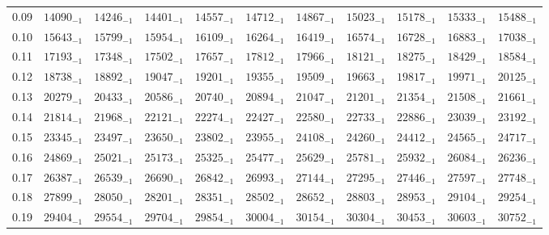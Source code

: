\documentclass[10pt, a4paper]{article}
\begin{document}
\begin{center}
\begin{longtable}{c | c c c c c | c c c c c}
        0.09 & \({14090}_{-1}\) & \({14246}_{-1}\) & \({14401}_{-1}\) & \({14557}_{-1}\) & \({14712}_{-1}\) & \({14867}_{-1}\) & \({15023}_{-1}\) & \({15178}_{-1}\) & \({15333}_{-1}\) & \({15488}_{-1}\)\\
        0.10 & \({15643}_{-1}\) & \({15799}_{-1}\) & \({15954}_{-1}\) & \({16109}_{-1}\) & \({16264}_{-1}\) & \({16419}_{-1}\) & \({16574}_{-1}\) & \({16728}_{-1}\) & \({16883}_{-1}\) & \({17038}_{-1}\)\\
        0.11 & \({17193}_{-1}\) & \({17348}_{-1}\) & \({17502}_{-1}\) & \({17657}_{-1}\) & \({17812}_{-1}\) & \({17966}_{-1}\) & \({18121}_{-1}\) & \({18275}_{-1}\) & \({18429}_{-1}\) & \({18584}_{-1}\)\\
        0.12 & \({18738}_{-1}\) & \({18892}_{-1}\) & \({19047}_{-1}\) & \({19201}_{-1}\) & \({19355}_{-1}\) & \({19509}_{-1}\) & \({19663}_{-1}\) & \({19817}_{-1}\) & \({19971}_{-1}\) & \({20125}_{-1}\)\\
        0.13 & \({20279}_{-1}\) & \({20433}_{-1}\) & \({20586}_{-1}\) & \({20740}_{-1}\) & \({20894}_{-1}\) & \({21047}_{-1}\) & \({21201}_{-1}\) & \({21354}_{-1}\) & \({21508}_{-1}\) & \({21661}_{-1}\)\\
        0.14 & \({21814}_{-1}\) & \({21968}_{-1}\) & \({22121}_{-1}\) & \({22274}_{-1}\) & \({22427}_{-1}\) & \({22580}_{-1}\) & \({22733}_{-1}\) & \({22886}_{-1}\) & \({23039}_{-1}\) & \({23192}_{-1}\)\\
        0.15 & \({23345}_{-1}\) & \({23497}_{-1}\) & \({23650}_{-1}\) & \({23802}_{-1}\) & \({23955}_{-1}\) & \({24108}_{-1}\) & \({24260}_{-1}\) & \({24412}_{-1}\) & \({24565}_{-1}\) & \({24717}_{-1}\)\\
        0.16 & \({24869}_{-1}\) & \({25021}_{-1}\) & \({25173}_{-1}\) & \({25325}_{-1}\) & \({25477}_{-1}\) & \({25629}_{-1}\) & \({25781}_{-1}\) & \({25932}_{-1}\) & \({26084}_{-1}\) & \({26236}_{-1}\)\\
        0.17 & \({26387}_{-1}\) & \({26539}_{-1}\) & \({26690}_{-1}\) & \({26842}_{-1}\) & \({26993}_{-1}\) & \({27144}_{-1}\) & \({27295}_{-1}\) & \({27446}_{-1}\) & \({27597}_{-1}\) & \({27748}_{-1}\)\\
        0.18 & \({27899}_{-1}\) & \({28050}_{-1}\) & \({28201}_{-1}\) & \({28351}_{-1}\) & \({28502}_{-1}\) & \({28652}_{-1}\) & \({28803}_{-1}\) & \({28953}_{-1}\) & \({29104}_{-1}\) & \({29254}_{-1}\)\\
        0.19 & \({29404}_{-1}\) & \({29554}_{-1}\) & \({29704}_{-1}\) & \({29854}_{-1}\) & \({30004}_{-1}\) & \({30154}_{-1}\) & \({30304}_{-1}\) & \({30453}_{-1}\) & \({30603}_{-1}\) & \({30752}_{-1}\)\\

\end{longtable}
\end{center}
\end{document}
